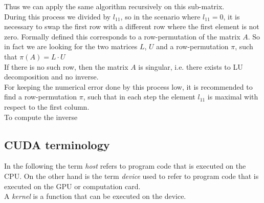 Thus we can apply the same algorithm recursively on this sub-matrix.
\vspace{0.3cm}\\
During this process we divided by $l_{11}$, so in the scenario where $l_{11}=0$, it is necessary to swap the first row with a different row where the first element is not zero. Formally defined this corresponds to a row-permutation of the matrix $A$. So in fact we are looking for the two matrices $L$, $U$ and a row-permutation $\pi$, such that $\pi(A) = L \cdot U$\\  
If there is no such row, then the matrix $A$ is singular, i.e. there exists to LU decomposition and no inverse. \\
For keeping the numerical error done by this process low, it is recommended to find a row-permutation $\pi$, such that in each step the element $l_{11}$ is maximal with respect to the first column.
\vspace{0.3cm}\\
To compute the inverse 

\subsection*{CUDA terminology}
In the following the term \emph{host} refers to program code that is executed on the CPU. On the other hand is the term \emph{device} used to refer to program code that is executed on the GPU or computation card.\\
A \emph{kernel} is a function that can be executed on the device.

